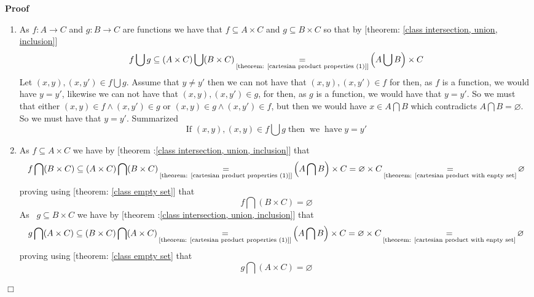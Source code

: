 \documentclass{book}
\newcommand{\equallim}{\mathop{=}\limits}
\newcommand{\tmop}[1]{\ensuremath{\operatorname{#1}}}
\newenvironment{proof}{\noindent\textbf{Proof\ }}{\hspace*{\fill}$\Box$\medskip}
\begin{document}
\begin{proof}
  
  \begin{enumerate}
    \item As $f : A \rightarrow C$ and $g : B \rightarrow C$ are functions we
    have that $f \subseteq A \times C$ and $g \subseteq B \times C$ so that by
    [theorem: \ref{class intersection, union, inclusion}]
    \[ f \bigcup g \subseteq (A \times C) \bigcup (B \times C)
       \equallim_{\text{[theorem: \ref{cartesian product properties (1)}]}}
       \left( A \bigcup B \right) \times C \]
    Let $(x, y), (x, y') \in f \bigcup g$. Assume that $y \neq y'$ then we can
    not have that $(x, y), (x, y') \in f$ for then, as $f$ is a function, we
    would have $y = y'$, likewise we can not have that $(x, y), (x, y') \in
    g$, for then, as $g$ is a function, we would have that $y = y'$. So we
    must that either $(x, y) \in f \wedge (x, y') \in g$ or $(x, y) \in g
    \wedge (x, y') \in f$, but then we would have $x \in A \bigcap B$ which
    contradicts $A \bigcap B = \varnothing$. So we must have that $y = y'$.
    Summarized
    \[ \text{If } (x, y), (x, y) \in f \bigcup g \tmop{then} \tmop{we}
       \tmop{have} y = y' \]
    \item As $f \subseteq A \times C$ we have by [theorem :\ref{class
    intersection, union, inclusion}] that
    \[ f \bigcap (B \times C) \subseteq (A \times C) \bigcap (B \times C)
       \equallim_{\text{[theorem: \ref{cartesian product properties (1)}]}}
       \left( A \bigcap B \right) \times C = \varnothing \times C
       \equallim_{\text{[theorem: \ref{cartesian product with enpty set}}}
       \varnothing \]
    proving using [theorem: \ref{class empty set}] that
    \begin{equation}
      \label{eq 2.21.017} f \bigcap (B \times C) = \varnothing
    \end{equation}
    As \ $g \subseteq B \times C$ we have by [theorem :\ref{class
    intersection, union, inclusion}] that
    \[ g \bigcap (A \times C) \subseteq (B \times C) \bigcap (A \times C)
       \equallim_{\text{[theorem: \ref{cartesian product properties (1)}]}}
       \left( A \bigcap B \right) \times C = \varnothing \times C
       \equallim_{\text{[theorem: \ref{cartesian product with enpty set}}}
       \varnothing \]
    proving using [theorem: \ref{class empty set} that
    \begin{equation}
      \label{eq 2.22.017} g \bigcap (A \times C) = \varnothing
    \end{equation}

\end{enumerate}
\end{proof}
\end{document}
